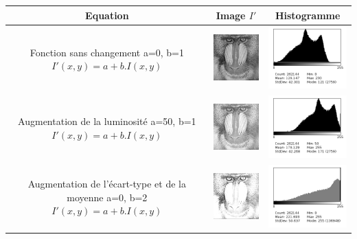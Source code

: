 \documentclass[a4paper,11pt]{article}
\begin{document}
  \begin{tabular}{|c|c|c|}
    \hline
    Equation & Image $I'$ & Histogramme\\
    \hline
    \shortstack{Fonction sans changement \\ a=0, b=1 \\ $I'(x,y)=a+b.I(x,y)$} & \includegraphics[width=3cm]{mandrill.png} & \includegraphics[width=4cm]{../histo/image/hist_mandrill.png}\\
    \hline
    \shortstack{Augmentation de la luminosité \\ a=50, b=1 \\ $I'(x,y)=a+b.I(x,y)$} & \includegraphics[width=3cm]{../res/mandrillQ2_50x1.png} & \includegraphics[width=4cm]{../histo/resultat/hist_mandrillQ2_50x1.png}\\
    \hline
    \shortstack{Augmentation de l'écart-type \\ et de la moyenne \\ a=0, b=2 \\ $I'(x,y)=a+b.I(x,y)$} & \includegraphics[width=3cm]{../res/mandrillQ2_0x2.png} & \includegraphics[width=4cm]{../histo/resultat/hist_mandrillQ2_0x2.png}\\

\end{tabular}
\end{document}
